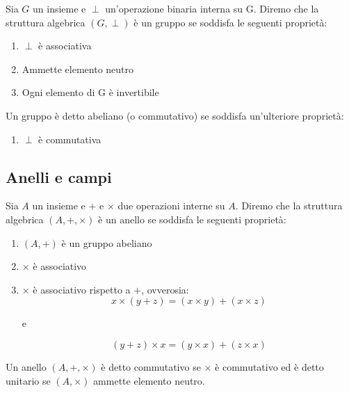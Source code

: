 \documentclass[11pt,a4paper]{article}
\theoremstyle{plain}
\theoremstyle{remark}
\theoremstyle{definition}
\theoremstyle{definition}
\newenvironment{definizione}[1]
{\renewcommand{\thedefmanuale}{#1}\defmanuale}
{\enddefmanuale}
\theoremstyle{plain}
\begin{document}
	\begin{definizione}{2.1}
		Sia $G$ un insieme e $\perp$ un'operazione binaria interna su G. Diremo che la struttura algebrica $(G, \perp)$ è un gruppo se soddisfa le seguenti proprietà:
		
		\begin{enumerate}[label=\roman*)]
			
			\item $\perp$ è associativa
			\item Ammette elemento neutro
			\item Ogni elemento di G è invertibile
			
		\end{enumerate}
		
		Un gruppo è detto abeliano (o commutativo) se soddisfa un'ulteriore proprietà:
		
		\begin{enumerate}[label=\roman*), start=4]
			\item $\perp$ è commutativa
		\end{enumerate}
		
	\end{definizione}
	
	\subsection{Anelli e campi}
	
	\begin{definizione}{2.5 (Anello)}
		Sia $A$ un insieme e $+$ e $\times$ due operazioni interne su $A$. Diremo che la struttura algebrica $(A, +, \times)$ è un anello se soddisfa le seguenti proprietà:
		
		\begin{enumerate}[label=\roman*)]
			\item $(A, +)$ è un gruppo abeliano
			\item $\times$ è associativo
			\item $\times$ è associativo rispetto a $+$, ovverosia:
			$$x \times (y+z) = (x \times y) + (x \times z)$$
			\begin{center}
				e
			\end{center}
			$$(y+z)\times x = (y \times x) + (z \times x)$$
		\end{enumerate}
		
		Un anello $(A, +, \times)$ è detto commutativo se $\times$ è commutativo ed è detto unitario se $(A, \times)$ ammette elemento neutro.
		
	\end{definizione}
	
\end{document}
